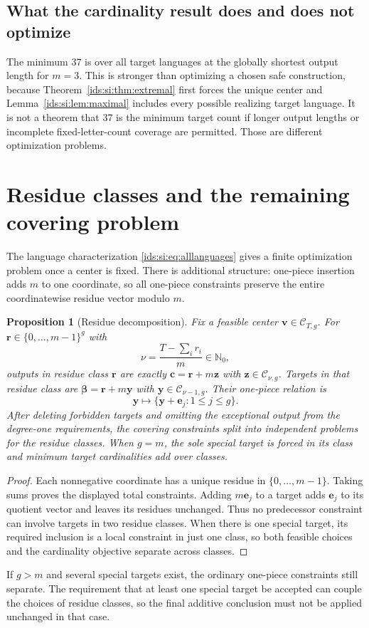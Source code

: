 \documentclass[11pt,letterpaper]{article}
\newtheorem{proposition}[theorem]{Proposition}
\theoremstyle{definition}\newtheorem{definition}[theorem]{Definition}
\theoremstyle{remark}\newtheorem{remark}[theorem]{Remark}
\theoremstyle{definition}\newtheorem{question}[theorem]{Question}
\newcommand{\Nzero}{\mathbb N_0}
\newcommand{\bpC}[2]{\mathcal C_{#1,#2}}
\begin{document}
\subsection{What the cardinality result does and does not optimize}
The minimum $37$ is over all target languages at the globally shortest
output length for $m=3$. This is stronger than optimizing a chosen safe
construction, because Theorem~\ref{ids:si:thm:extremal} first forces the unique center and
Lemma~\ref{ids:si:lem:maximal} includes every possible realizing target language.
It is not a theorem that $37$ is the minimum target count if longer output
lengths or incomplete fixed-letter-count coverage are permitted. Those
are different optimization problems.

\section{Residue classes and the remaining covering problem}\label{ids:si:sec:residues}

The language characterization \eqref{ids:si:eq:alllanguages} gives a finite
optimization problem once a center is fixed. There is additional structure:
one-piece insertion adds $m$ to one coordinate, so all one-piece constraints
preserve the entire coordinatewise residue vector modulo $m$.

\begin{proposition}[Residue decomposition]\label{ids:si:prop:residues}
Fix a feasible center $\mathbf v\in\bpC{T}{g}$. For
$\mathbf r\in\{0,\ldots,m-1\}^g$ with
\[
 \nu=\frac{T-\sum_i r_i}{m}\in\Nzero,
\]
outputs in residue class $\mathbf r$ are exactly
$\mathbf c=\mathbf r+m\mathbf z$ with $\mathbf z\in\bpC{\nu}{g}$.
Targets in that residue class are
$\boldsymbol\beta=\mathbf r+m\mathbf y$ with $\mathbf y\in\bpC{\nu-1}{g}$.
Their one-piece relation is
\begin{equation}\label{ids:si:eq:residueedges}
 \mathbf y\longmapsto\{\mathbf y+\mathbf e_j:1\leq j\leq g\}.
\end{equation}
After deleting forbidden targets and omitting the exceptional output from
the degree-one requirements, the covering constraints split into independent
problems for the residue classes. When $g=m$, the sole special target is
forced in its class and minimum target cardinalities add over classes.
\end{proposition}
\begin{proof}
Each nonnegative coordinate has a unique residue in $\{0,\ldots,m-1\}$.
Taking sums proves the displayed total constraints. Adding $m\mathbf e_j$ to a
target adds $\mathbf e_j$ to its quotient vector and leaves its residues unchanged.
Thus no predecessor constraint can involve targets in two residue classes.
When there is one special target, its required inclusion is a local
constraint in just one class, so both feasible choices and the cardinality
objective separate across classes.
\end{proof}
If $g>m$ and several special targets exist, the ordinary one-piece constraints
still separate. The requirement that at least one special target be accepted
can couple the choices of residue classes, so the final additive conclusion
must not be applied unchanged in that case.
\end{document}
